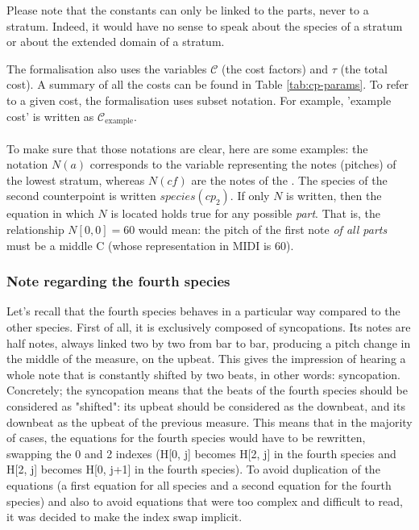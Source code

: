 Please note that the constants can only be linked to the parts, never to a stratum. Indeed, it would have no sense to speak about the species of a stratum or about the extended domain of a stratum.

The formalisation also uses the variables $\mathcal{C}$ (the cost factors) and $\tau$ (the total cost). A summary of all the costs can be found in Table \ref{tab:cp-params}. To refer to a given cost, the formalisation uses subset notation. For example, 'example cost' is written as $\mathcal{C}_{\text{example}}$.

\paragraph{}
To make sure that those notations are clear, here are some examples: the notation $N(a)$ corresponds to the variable representing the notes (pitches) of the lowest stratum, whereas $N(\mathit{cf})$ are the notes of the \cf. The species of the second counterpoint is written $species(cp_2)$. If only $N$ is written, then the equation in which $N$ is located holds true for any possible \textit{part}. That is, the relationship $N[0, 0] = 60$ would mean: the pitch of the first note \textit{of all parts} must be a middle C (whose representation in MIDI is 60).

\subsubsection{Note regarding the fourth species}\label{nota-bene-4th-species} Let's recall that the fourth species behaves in a particular way compared to the other species. First of all, it is exclusively composed of syncopations. Its notes are half notes, always linked two by two from bar to bar, producing a pitch change in the middle of the measure, on the upbeat. This gives the impression of hearing a whole note that is constantly shifted by two beats, in other words: syncopation.
Concretely; the syncopation means that the beats of the fourth species should be considered as "shifted": its upbeat should be considered as the downbeat, and its downbeat as the upbeat of the previous measure. This means that in the majority of cases, the equations for the fourth species would have to be rewritten, swapping the 0 and 2 indexes (H[0, j] becomes H[2, j] in the fourth species and H[2, j] becomes H[0, j+1] in the fourth species). To avoid duplication of the equations (a first equation for all species and a second equation for the fourth species) and also to avoid equations that were too complex and difficult to read, it was decided to make the index swap implicit.

